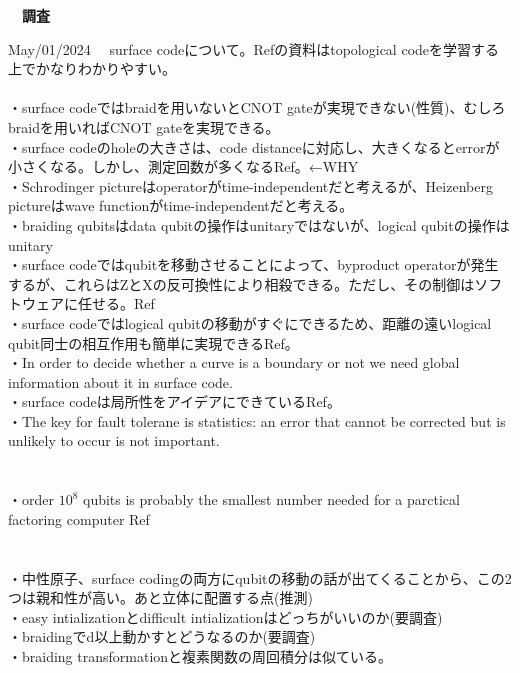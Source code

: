 \documentclass[a4paper,10.5pt]{ltjsarticle}
\begin{document}
\centerline
{\huge \bfseries　調査}
\rightline
{May/01/2024}
\leftline
{}
　surface codeについて。Ref\cite{2}の資料はtopological codeを学習する上でかなりわかりやすい。\\
\\
・surface codeではbraidを用いないとCNOT gateが実現できない(性質)、むしろbraidを用いればCNOT gateを実現できる。\\
・surface codeのholeの大きさは、code distanceに対応し、大きくなるとerrorが小さくなる。しかし、測定回数が多くなるRef\cite{1}。←WHY\\
・Schrodinger pictureはoperatorがtime-independentだと考えるが、Heizenberg pictureはwave functionがtime-independentだと考える。\\
・braiding qubitsはdata qubitの操作はunitaryではないが、logical qubitの操作はunitary\\
・surface codeではqubitを移動させることによって、byproduct operatorが発生するが、これらはZとXの反可換性により相殺できる。ただし、その制御はソフトウェアに任せる。Ref\cite{1}\\
・surface codeではlogical qubitの移動がすぐにできるため、距離の遠いlogical qubit同士の相互作用も簡単に実現できるRef\cite{1}。\\
・In order to decide whether a curve is a boundary or not we need global information about it in surface code.\\
・surface codeは局所性をアイデアにできているRef\cite{2}。\\
・The key for fault tolerane is statistics: an error that cannot be corrected but is unlikely to occur is not important.\\
\\
\\
・order $10^8$ qubits is probably the smallest number needed for a parctical factoring computer Ref\cite{1}\\
\\
\\
・中性原子、surface codingの両方にqubitの移動の話が出てくることから、この2つは親和性が高い。あと立体に配置する点(推測)\\
・easy intializationとdifficult intializationはどっちがいいのか(要調査)\\
・braidingでd以上動かすとどうなるのか(要調査)\\
・braiding transformationと複素関数の周回積分は似ている。\\
\\
\end{document}
